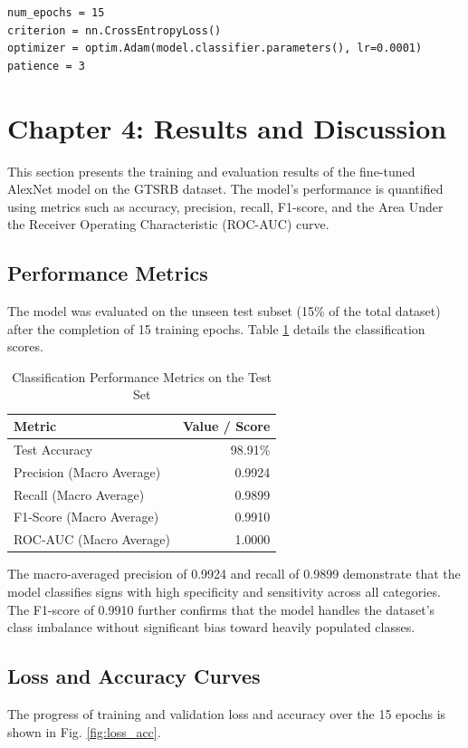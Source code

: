 \documentclass[conference]{IEEEtran}
\begin{document}
\begin{lstlisting}
num_epochs = 15
criterion = nn.CrossEntropyLoss()
optimizer = optim.Adam(model.classifier.parameters(), lr=0.0001)
patience = 3
\end{lstlisting}

\section{Chapter 4: Results and Discussion}
This section presents the training and evaluation results of the fine-tuned AlexNet model on the GTSRB dataset. The model's performance is quantified using metrics such as accuracy, precision, recall, F1-score, and the Area Under the Receiver Operating Characteristic (ROC-AUC) curve.

\subsection{Performance Metrics}
The model was evaluated on the unseen test subset (15\% of the total dataset) after the completion of 15 training epochs. Table \ref{tab:test_metrics} details the classification scores.

\begin{table}[htbp]
\caption{Classification Performance Metrics on the Test Set}
\begin{center}
\begin{tabular}{|l|r|}
\hline
\textbf{Metric} & \textbf{Value / Score} \\
\hline
Test Accuracy & 98.91\% \\
\hline
Precision (Macro Average) & 0.9924 \\
\hline
Recall (Macro Average) & 0.9899 \\
\hline
F1-Score (Macro Average) & 0.9910 \\
\hline
ROC-AUC (Macro Average) & 1.0000 \\
\hline
\end{tabular}
\label{tab:test_metrics}
\end{center}
\end{table}

The macro-averaged precision of 0.9924 and recall of 0.9899 demonstrate that the model classifies signs with high specificity and sensitivity across all categories. The F1-score of 0.9910 further confirms that the model handles the dataset's class imbalance without significant bias toward heavily populated classes.

\subsection{Loss and Accuracy Curves}
The progress of training and validation loss and accuracy over the 15 epochs is shown in Fig. \ref{fig:loss_acc}. 
\end{document}
